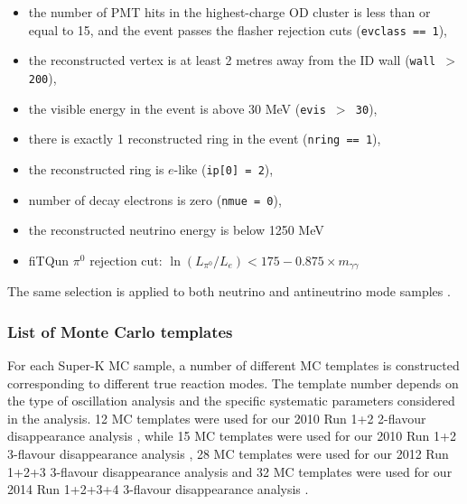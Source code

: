 \begin{itemize}
\item
the number of PMT hits in the highest-charge OD cluster is less than or
equal to 15, and the event passes the flasher rejection cuts
({\tt evclass == 1}),
\item
the reconstructed vertex is at least 2 metres away from the ID wall 
({\tt wall $>$ 200}),
\item
the visible energy in the event is above 30 MeV 
({\tt evis  $>$ 30}),
\item
there is exactly 1 reconstructed ring in the event 
({\tt nring == 1}),
\item
the reconstructed ring is $e$-like 
({\tt ip[0] = 2}),
\item
number of decay electrons is zero
({\tt nmue = 0}),
\item
the reconstructed neutrino energy is below 1250 MeV
\item
fiTQun $\pi^0$ rejection cut: $\ln (L_{\pi^0} / L_e ) < 175 - 0.875 \times m_{\gamma \gamma} $
\end{itemize}

The same selection is applied to both neutrino and antineutrino mode samples \cite{Superk_run56}.


\subsubsection {List of Monte Carlo templates}
\label{sec:mc_templates:template_list}

For each Super-K MC sample, a number of different MC templates is constructed 
corresponding to different true reaction modes.
The template number depends on the type of oscillation analysis and the specific 
systematic parameters considered in the analysis.
12 MC templates were used for our 2010 Run 1+2 2-flavour disappearance analysis \cite{OurRun12DisappAnalysis}, while
15 MC templates were used for our 2010 Run 1+2 3-flavour disappearance analysis \cite{OurRun12DisappAnalysis3Flavour},
28 MC templates were used for our 2012 Run 1+2+3 3-flavour disappearance analysis \cite{OurRun123DisappAnalysis3Flavour} and
32 MC templates were used for our 2014 Run 1+2+3+4 3-flavour disappearance analysis \cite{OurRun1234DisappAnalysis3Flavour}.


